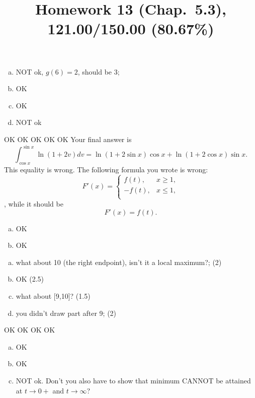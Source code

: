 \documentclass[10pt]{article} %
\title{Homework 13 (Chap.~5.3),
121.00/150.00 (80.67\%)
}
\begin{document}
\maketitle
{}
\begin{enumerate}[(a)]
  \item NOT ok, $g(6)=2$, should be 3;
  \item OK
  \item OK
  \item NOT ok
\end{enumerate}
OK
OK
OK
OK
OK
Your final answer is
\begin{equation*}
  \int_{\cos x}^{\sin x}\ln\left( 1+2v \right)dv = \ln \left( 1+2\sin x \right)
  \cos x+\ln\left( 1+2\cos x \right)\sin x.
\end{equation*}
This equality is wrong.
The following formula you wrote is wrong:\begin{equation*}
  F'(x)=\begin{cases}
    f(t),&x\ge1,\\
    -f(t),&x\le1,\\
  \end{cases}
\end{equation*}
  , while it should be\begin{equation*}
    F'(x)=f(t).
  \end{equation*}
\begin{enumerate}[(a)]
  \item OK
  \item OK
\end{enumerate}
\begin{enumerate}[(a)]
  \item what about 10 (the right endpoint), isn't it a local maximum?; (2)
  \item OK (2.5)
  \item what about [9,10]? (1.5)
  \item you didn't draw part after 9; (2)
\end{enumerate}
OK
OK
OK
OK
\begin{enumerate}[(a)]
	\item OK
	\item OK
	\item NOT ok. Don't you also have to show that minimum CANNOT be attained at $t\to0+$ and $t\to\infty$?
\end{enumerate}
\end{document}
